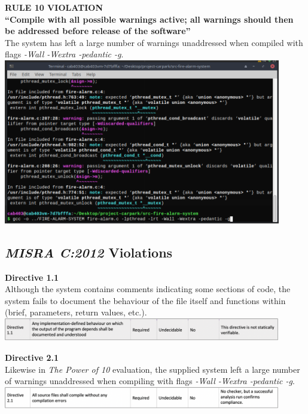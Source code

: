 \documentclass[a4paper]{article}
\begin{document}
\newpage
\par \noindent \textbf{RULE 10 VIOLATION\\ “Compile with all possible warnings active; all warnings should then be addressed before release of the software”} \\[1\baselineskip]
The system has left a large number of warnings unaddressed when compiled with flags \emph{-Wall -Wextra -pedantic -g}. \\[1\baselineskip]
\includegraphics[width=12.12cm]{report-img/nasa-rule-10-violation.png}

\subsection{\emph{MISRA C:2012} Violations}

\par \noindent \textbf{Directive 1.1} \\[1\baselineskip]
Although the system contains comments indicating some sections of code, the system fails to document the behaviour of the file itself and functions within (brief, parameters, return values, etc.). \\[1\baselineskip]
\includegraphics[width=12.12cm]{report-img/misra-c-1.png}

\par \noindent \textbf{Directive 2.1} \\[1\baselineskip]
Likewise in \emph{The Power of 10} evaluation, the supplied system left a large number of warnings unaddressed when compiling with flags \emph{-Wall -Wextra -pedantic -g}. \\[1\baselineskip]
\includegraphics[width=12.12cm]{report-img/misra-c-2.png}
\end{document}
